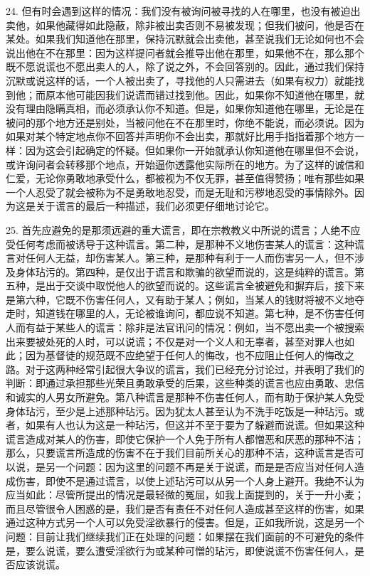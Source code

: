 24. 但有时会遇到这样的情况：我们没有被询问被寻找的人在哪里，也没有被迫出卖他，如果他藏得如此隐蔽，除非被出卖否则不易被发现；但我们被问，他是否在某处。如果我们知道他在那里，保持沉默就会出卖他，甚至说我们无论如何也不会说出他在不在那里：因为这样提问者就会推导出他在那里，如果他不在，那么那个既不愿说谎也不愿出卖人的人，除了说之外，不会回答别的。因此，通过我们保持沉默或说这样的话，一个人被出卖了，寻找他的人只需进去（如果有权力）就能找到他；而原本他可能因我们说谎而错过找到他。因此，如果你不知道他在哪里，就没有理由隐瞒真相，而必须承认你不知道。但是，如果你知道他在哪里，无论是在被问的那个地方还是别处，当被问他在不在那里时，你绝不能说，而必须说。因为如果对某个特定地点你不回答并声明你不会出卖，那就好比用手指指着那个地方一样：因为这会引起确定的怀疑。但如果你一开始就承认你知道他在哪里但不会说，或许询问者会转移那个地点，开始逼你透露他实际所在的地方。为了这样的诚信和仁爱，无论你勇敢地承受什么，都被视为不仅无罪，甚至值得赞扬；唯有那些如果一个人忍受了就会被称为不是勇敢地忍受，而是无耻和污秽地忍受的事情除外。因为这是关于谎言的最后一种描述，我们必须更仔细地讨论它。\par

25. 首先应避免的是那须远避的重大谎言，即在宗教教义中所说的谎言；人绝不应受任何考虑而被诱导于这种谎言。第二种，是那种不义地伤害某人的谎言：这种谎言对任何人无益，却伤害某人。第三种，是那种有利于一人而伤害另一人，但不涉及身体玷污的。第四种，是仅出于谎言和欺骗的欲望而说的，这是纯粹的谎言。第五种，是出于交谈中取悦他人的欲望而说的。这些谎言全被避免和摒弃后，接下来是第六种，它既不伤害任何人，又有助于某人；例如，当某人的钱财将被不义地夺走时，知道钱在哪里的人，无论被谁询问，都应说不知道。第七种，是不伤害任何人而有益于某些人的谎言：除非是法官讯问的情况：例如，当不愿出卖一个被搜索出来要被处死的人时，可以说谎；不仅是对一个义人和无辜者，甚至对罪人也如此；因为基督徒的规范既不应绝望于任何人的悔改，也不应阻止任何人的悔改之路。对于这两种经常引起很大争议的谎言，我们已经充分讨论过，并表明了我们的判断：即通过承担那些光荣且勇敢承受的后果，这些种类的谎言也应由勇敢、忠信和诚实的人男女所避免。第八种谎言是那种不伤害任何人，而有助于保护某人免受身体玷污，至少是上述那种玷污。因为犹太人甚至认为不洗手吃饭是一种玷污。或者，如果有人也认为这是一种玷污，但这并不至于要为了躲避而说谎。但如果这种谎言造成对某人的伤害，即使它保护一个人免于所有人都憎恶和厌恶的那种不洁；那么，只要谎言所造成的伤害不在于我们目前所关心的那种不洁，这种谎言是否可以说，是另一个问题：因为这里的问题不再是关于说谎，而是是否应当对任何人造成伤害，即使不是通过谎言，以使上述玷污可以从另一个人身上避开。我绝不认为应当如此：尽管所提出的情况是最轻微的冤屈，如我上面提到的，关于一升小麦；而且尽管很令人困惑的是，我们是否有责任不对任何人造成甚至这样的伤害，如果通过这种方式另一个人可以免受淫欲暴行的侵害。但是，正如我所说，这是另一个问题：目前让我们继续我们正在处理的问题：如果摆在我们面前的不可避免的条件是，要么说谎，要么遭受淫欲行为或某种可憎的玷污，即使说谎不伤害任何人，是否应该说谎。\par


